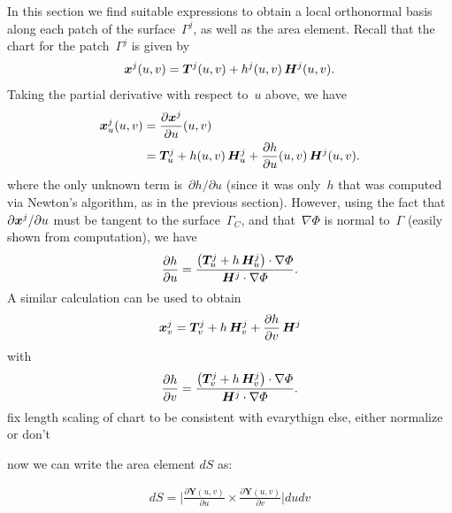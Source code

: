 \documentclass[11pt]{article}
\numberwithin{equation}{section}
\newcommand{\vct}{\vectorsym}
\newcommand{\lp}{\left(}
\newcommand{\rp}{\right)}
\newcommand\bY{\boldsymbol Y}
\begin{document}
In this section we find suitable expressions to obtain a local
orthonormal basis along each patch of the surface~$\Gamma^j$, as well
as the area element.
Recall that the chart for the patch~$\Gamma^j$ is given by
\begin{equation}\label{chart}
    \vct{x}^j(u,v) = \vct{T}^j(u,v) + h^j(u,v) \, \vct{H}^j(u,v).
\end{equation}
Taking the partial derivative with respect to~$u$ above, we have
\begin{equation}\label{u_vector}
  \begin{aligned}
    \vct{x}^j_u(u,v) &=  \frac{\partial \vct{x}^j}{\partial u}(u,v) \\
    &= \vct{T}^j_u + h(u,v) \,
  \vct{H}^j_u   + \frac{\partial h}{\partial
    u}(u,v)
  \, \vct{H}^j(u,v).
  \end{aligned}
\end{equation}
where the only unknown term is~$\partial h / \partial u$ (since it was
only~$h$ that was computed via Newton's algorithm, as in the previous
section).
However, using the fact that~$\partial\vct{x}^j/\partial u$ must be
tangent to the surface~$\Gamma_C$, and that~$\nabla \Phi$ is normal
to~$\Gamma$ (easily shown from computation), we have
\begin{equation}\label{U_vector_2}
  \frac{\partial h}{\partial u} = \frac{\lp \vct{T}^j_u + h \, \vct{H}^j_u
  \rp \cdot \nabla \Phi }{\vct{H}^j \cdot \nabla \Phi}.
\end{equation}
A similar calculation can be used to obtain
\begin{equation}\label{v_vector}
    \vct{x}^j_v
    = \vct{T}^j_v + h \,
  \vct{H}^j_v   + \frac{\partial h}{\partial
    v}
  \, \vct{H}^j
\end{equation}
with
\begin{equation}\label{v_vector_2}
  \frac{\partial h}{\partial v} = \frac{\lp \vct{T}^j_v + h \, \vct{H}^j_v
  \rp \cdot \nabla \Phi }{\vct{H}^j \cdot \nabla \Phi}.
\end{equation}
{\color{red} fix length scaling of chart to be consistent with
  evarythign else, either normalize or don't}



now we can write the area element $dS$ as:

\begin{equation}\label{dS}
\begin{aligned}
 dS=\Bigg|\frac{\partial\bY(u,v)}{\partial u}\times\frac{\partial\bY(u,v)}{\partial v}\Bigg|dudv
\end{aligned}
\end{equation}
  
\end{document}

